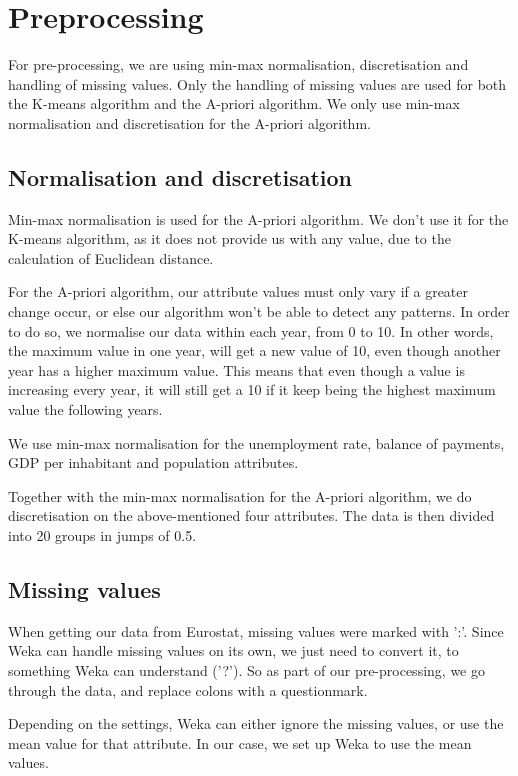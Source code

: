 \section{Preprocessing}
\label{PreP}For pre-processing, we are using min-max normalisation, discretisation and handling of missing values. Only the handling of missing values are used for both the K-means algorithm and the A-priori algorithm. We only use min-max normalisation and discretisation for the A-priori algorithm.

\subsection{Normalisation and discretisation}
Min-max normalisation is used for the A-priori algorithm. We don't use it for the K-means algorithm, as it does not provide us with any value, due to the calculation of Euclidean distance.

For the A-priori algorithm, our attribute values must only vary if a greater change occur, or else our algorithm won't be able to detect any patterns. In order to do so, we normalise our data within each year, from 0 to 10. In other words, the maximum value in one year, will get a new value of 10, even though another year has a higher maximum value. This means that even though a value is increasing every year, it will still get a 10 if it keep being the highest maximum value the following years.

We use min-max normalisation for the unemployment rate, balance of payments, GDP per inhabitant and population attributes.

Together with the min-max normalisation for the A-priori algorithm, we do discretisation on the above-mentioned four attributes. The data is then divided into 20 groups in jumps of 0.5.

\subsection{Missing values}
When getting our data from Eurostat, missing values were marked with ':'. Since Weka can handle missing values on its own, we just need to convert it, to something Weka can understand ('?'). So as part of our pre-processing, we go through the data, and replace colons with a questionmark.

Depending on the settings, Weka can either ignore the missing values, or use the mean value for that attribute. In our case, we set up Weka to use the mean values.